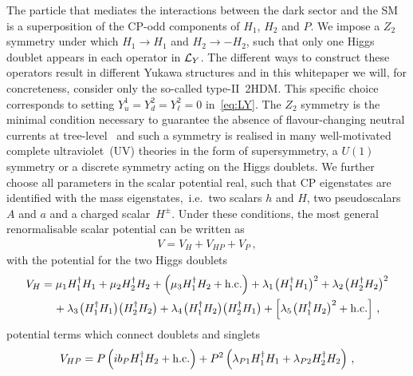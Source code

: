 \documentclass[a4paper, 11pt,notoc]{article}
\begin{document}
The particle that mediates the interactions between the dark sector and the SM is a superposition of the CP-odd components of $H_1$, $H_2$ and $P$. We impose a $Z_2$ symmetry under which $H_1\to H_1$ and $H_2\to -H_2$, such that only one Higgs doublet appears in each operator in ${\cal L}_{Y}$. The different ways to construct these operators result in different Yukawa structures and in this whitepaper we will, for concreteness, consider only the so-called type-II~2HDM. This specific choice corresponds to setting $Y_u^1  = Y_d^2 = Y_\ell^2 =0$ in~\eqref{eq:LY}.  The $Z_2$ symmetry is the minimal condition necessary to guarantee the absence of flavour-changing neutral currents at tree-level~\cite{Glashow:1976nt,Paschos:1976ay} and such a symmetry is realised in many well-motivated complete ultraviolet~(UV) theories in the form of supersymmetry, a $U(1)$ symmetry or  a discrete symmetry acting on the Higgs doublets. We further choose all parameters in the scalar potential real, such that CP eigenstates are identified with the mass eigenstates,~i.e.~two scalars $h$ and $H$, two pseudoscalars $A$ and $a$ and a charged scalar~$H^\pm$. Under these conditions, the most general renormalisable scalar potential can be written as 
\begin{align} \label{eq:V2HDMa}
V=V_H+V_{HP}+V_P\,,
\end{align}
with the potential for the two Higgs doublets
\begin{equation}\label{eq:VH}
\begin{split}
V_{H} & = \mu_1 H_1^\dagger H_1 + \mu_2 H_2^\dagger H_2 + \left ( \mu_3  H_1^\dagger H_2 + {\rm h.c.} \right ) + \lambda_1  \hspace{0.25mm} \big ( H_1^\dagger H_1  \big )^2  + \lambda_2  \hspace{0.25mm} \big ( H_2^\dagger H_2 \big  )^2  \\
& \phantom{xx} +  \lambda_3 \hspace{0.25mm} \big ( H_1^\dagger H_1  \big ) \big ( H_2^\dagger H_2  \big ) + \lambda_4  \hspace{0.25mm} \big ( H_1^\dagger H_2  \big ) \big ( H_2^\dagger H_1  \big ) + \left [ \lambda_5   \hspace{0.25mm} \big ( H_1^\dagger H_2 \big )^2 + {\rm h.c.} \right ]  \,,
\end{split}
\end{equation}
potential terms which connect doublets and singlets 
\begin{equation} \label{eq:VHP}
\begin{split}
V_{HP}  = P \left ( i  b_P   H_1^\dagger H_2 + {\rm h.c.} \right ) + P^2 \left (  \lambda_{P1}  H_1^\dagger H_1 +   \lambda_{P2}    H_2^\dagger H_2 \right )  \,,
\end{split} 
\end{equation}
\end{document}
